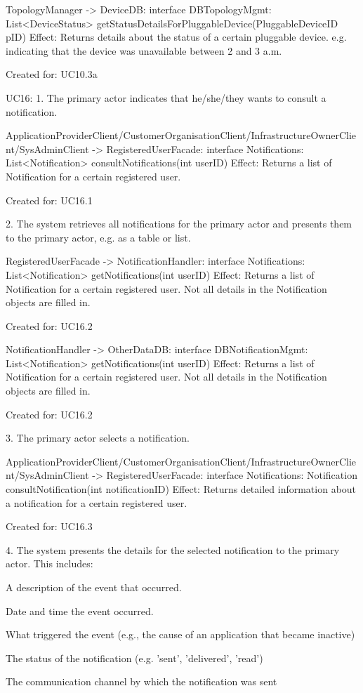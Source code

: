 {{{{{{{{{                TopologyManager -> DeviceDB: interface DBTopologyMgmt: List<DeviceStatus> getStatusDetailsForPluggableDevice(PluggableDeviceID pID)
                    Effect: Returns details about the status of a certain pluggable device. e.g. indicating that the device was unavailable between 2 and 3 a.m.
                    \item Created for: UC10.3a


    UC16:
        1. The primary actor indicates that he/she/they wants to consult a notification.

            ApplicationProviderClient/CustomerOrganisationClient/InfrastructureOwnerClient/SysAdminClient -> RegisteredUserFacade: interface Notifications: List<Notification> consultNotifications(int userID)
                Effect: Returns a list of Notification for a certain registered user.
                \item Created for: UC16.1

        2. The system retrieves all notifications for the primary actor and presents them to the primary actor, e.g. as a table or list.

            RegisteredUserFacade -> NotificationHandler: interface Notifications: List<Notification> getNotifications(int userID)
                Effect: Returns a list of Notification for a certain registered user. Not all details in the Notification objects are filled in.
                \item Created for: UC16.2

            NotificationHandler -> OtherDataDB: interface DBNotificationMgmt: List<Notification> getNotifications(int userID)
                Effect: Returns a list of Notification for a certain registered user. Not all details in the Notification objects are filled in.
                \item Created for: UC16.2

        3. The primary actor selects a notification.

            ApplicationProviderClient/CustomerOrganisationClient/InfrastructureOwnerClient/SysAdminClient -> RegisteredUserFacade: interface Notifications: Notification consultNotification(int notificationID)
                Effect: Returns detailed information about a notification for a certain registered user.
                \item Created for: UC16.3

        4. The system presents the details for the selected notification to the primary actor. This includes:
            { A description of the event that occurred.
            { Date and time the event occurred.
            { What triggered the event (e.g., the cause of an application that became inactive)
            { The status of the notification (e.g. 'sent', 'delivered', 'read')
            { The communication channel by which the notification was sent

}}}}}}}}}}}}}}
